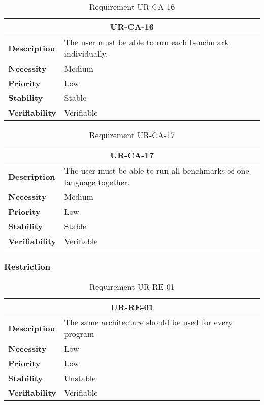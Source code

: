 \begin{table}[H]
    \centering
    \begin{tabular}{l p{10cm}}
        \toprule
        \multicolumn{2}{c}{UR-CA-16} \\
        \toprule
        \textbf{Description}        & The user must be able to run each benchmark individually. \\
        \textbf{Necessity}          & Medium   \\
        \textbf{Priority}           & Low   \\
        \textbf{Stability}          & Stable \\
        \textbf{Verifiability}      & Verifiable \\
    \end{tabular}
    \caption{Requirement UR-CA-16}
    \label{tab:ur-ca-16}
\end{table}

\begin{table}[H]
    \centering
    \begin{tabular}{l p{10cm}}
        \toprule
        \multicolumn{2}{c}{UR-CA-17} \\
        \toprule
        \textbf{Description}        & The user must be able to run all benchmarks of one language together. \\
        \textbf{Necessity}          & Medium   \\
        \textbf{Priority}           & Low   \\
        \textbf{Stability}          & Stable \\
        \textbf{Verifiability}      & Verifiable \\
    \end{tabular}
    \caption{Requirement UR-CA-17}
    \label{tab:ur-ca-17}
\end{table}

\subsubsection{Restriction}

\begin{table}[H]
    \centering
    \begin{tabular}{l p{10cm}}
        \toprule
        \multicolumn{2}{c}{UR-RE-01} \\
        \toprule
        \textbf{Description}        &  The same architecture should be used for every program \\
        \textbf{Necessity}          &  Low \\
        \textbf{Priority}           &  Low \\
        \textbf{Stability}          &  Unstable \\
        \textbf{Verifiability}      &  Verifiable \\
    \end{tabular}
    \caption{Requirement UR-RE-01}
    \label{tab:ur-re-01}
\end{table}

